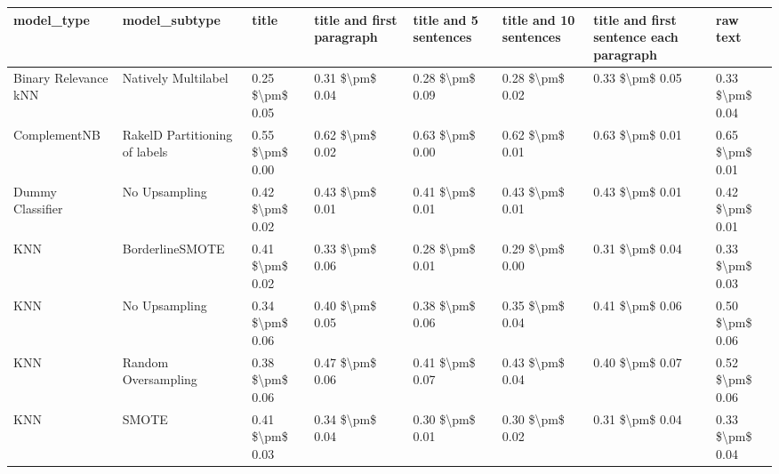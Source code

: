 \begin{tabular}{llllllll}
\toprule
                     model\_type &                 model\_subtype &           title & title and first paragraph & title and 5 sentences & title and 10 sentences & title and first sentence each paragraph &            raw text \\
\midrule
           Binary Relevance kNN &           Natively Multilabel & 0.25 \$\textbackslash pm\$ 0.05 &           0.31 \$\textbackslash pm\$ 0.04 &       0.28 \$\textbackslash pm\$ 0.09 &        0.28 \$\textbackslash pm\$ 0.02 &                         0.33 \$\textbackslash pm\$ 0.05 &     0.33 \$\textbackslash pm\$ 0.04 \\
                   ComplementNB & RakelD Partitioning of labels & 0.55 \$\textbackslash pm\$ 0.00 &           0.62 \$\textbackslash pm\$ 0.02 &       0.63 \$\textbackslash pm\$ 0.00 &        0.62 \$\textbackslash pm\$ 0.01 &                         0.63 \$\textbackslash pm\$ 0.01 &     0.65 \$\textbackslash pm\$ 0.01 \\
               Dummy Classifier &                 No Upsampling & 0.42 \$\textbackslash pm\$ 0.02 &           0.43 \$\textbackslash pm\$ 0.01 &       0.41 \$\textbackslash pm\$ 0.01 &        0.43 \$\textbackslash pm\$ 0.01 &                         0.43 \$\textbackslash pm\$ 0.01 &     0.42 \$\textbackslash pm\$ 0.01 \\
                            KNN &               BorderlineSMOTE & 0.41 \$\textbackslash pm\$ 0.02 &           0.33 \$\textbackslash pm\$ 0.06 &       0.28 \$\textbackslash pm\$ 0.01 &        0.29 \$\textbackslash pm\$ 0.00 &                         0.31 \$\textbackslash pm\$ 0.04 &     0.33 \$\textbackslash pm\$ 0.03 \\
                            KNN &                 No Upsampling & 0.34 \$\textbackslash pm\$ 0.06 &           0.40 \$\textbackslash pm\$ 0.05 &       0.38 \$\textbackslash pm\$ 0.06 &        0.35 \$\textbackslash pm\$ 0.04 &                         0.41 \$\textbackslash pm\$ 0.06 &     0.50 \$\textbackslash pm\$ 0.06 \\
                            KNN &           Random Oversampling & 0.38 \$\textbackslash pm\$ 0.06 &           0.47 \$\textbackslash pm\$ 0.06 &       0.41 \$\textbackslash pm\$ 0.07 &        0.43 \$\textbackslash pm\$ 0.04 &                         0.40 \$\textbackslash pm\$ 0.07 &     0.52 \$\textbackslash pm\$ 0.06 \\
                            KNN &                         SMOTE & 0.41 \$\textbackslash pm\$ 0.03 &           0.34 \$\textbackslash pm\$ 0.04 &       0.30 \$\textbackslash pm\$ 0.01 &        0.30 \$\textbackslash pm\$ 0.02 &                         0.31 \$\textbackslash pm\$ 0.04 &     0.33 \$\textbackslash pm\$ 0.04 \\

\end{tabular}
